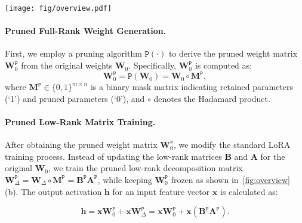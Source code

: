 \begin{figure*}[t]
\begin{center}
\texttt{[image: fig/overview.pdf]}
\vspace{-10pt} %
\caption{
Comparison of \method and LoRA: Training (subfigures a and b) and Inference (c and d). Key stages include the offline process of the frozen full-rank matrix $\mathbf{W}_{0}^{*}$ (subfigure e) and the online generation of the learnable low-rank matrix $\mathbf{W}_{\Delta}^{*}$ (f) during \method training (b) and inference (d).
}
\label{fig:overview}
\end{center}
\vskip -0.2in
\end{figure*}

\paragraph{Pruned Full-Rank Weight Generation.}
First, we employ a pruning algorithm $\mathtt{P}(\cdot)$ to derive the pruned weight matrix $\mathbf{W}_0^\mathtt{P}$ from the original weights $\mathbf{W}_0$. Specifically, $\mathbf{W}_0^\mathtt{P}$ is computed as:
\begin{equation}
\mathbf{W}_{0}^\mathtt{P} = \mathtt{P}(\mathbf{W}_0) = \mathbf{W}_0 \circ \mathbf{M}^\mathtt{P},
\end{equation}
where $\mathbf{M}^\mathtt{P} \in \{0, 1\}^{m \times n}$ is a binary mask matrix indicating retained parameters (`1') and pruned parameters (`0'), and $\circ$ denotes the Hadamard product. 

\paragraph{Pruned Low-Rank Matrix Training.}
After obtaining the pruned weight matrix $\mathbf{W}_0^\mathtt{P}$, we modify the standard LoRA training process. 
Instead of updating the low-rank matrices $\mathbf{B}$ and $\mathbf{A}$ for the original $\mathbf{W}_0$, 
we train the pruned low-rank decomposition matrix $\mathbf{W}_{\Delta}^\mathtt{P} = \mathbf{W}_{\Delta} \circ \mathbf{M}^\mathtt{P} = \mathbf{B}^\mathtt{P}\mathbf{A}^\mathtt{P}$, while keeping $\mathbf{W}_0^\mathtt{P}$ frozen as shown in~\cref{fig:overview} (b). 
The output activation $\mathbf{h}$ for an input feature vector $\mathbf{x}$ is calculated as:

\begin{equation}
\mathbf{h} 
= \mathbf{x} \mathbf{W}_0^\mathtt{P} + \mathbf{x} \mathbf{W}_{\Delta}^\mathtt{P}
= \mathbf{x} \mathbf{W}_0^\mathtt{P} + \mathbf{x} (\mathbf{B}^\mathtt{P}\mathbf{A}^\mathtt{P}).
\end{equation}

